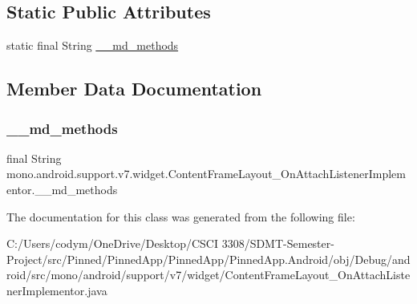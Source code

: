 \subsection*{Static Public Attributes}
\begin{DoxyCompactItemize}
\item 
static final String \hyperlink{classmono_1_1android_1_1support_1_1v7_1_1widget_1_1_content_frame_layout___on_attach_listener_implementor_adb104bec4ab09495309f1f1f22b6fac4}{\+\_\+\+\_\+md\+\_\+methods}
\end{DoxyCompactItemize}


\subsection{Member Data Documentation}
\mbox{\label{classmono_1_1android_1_1support_1_1v7_1_1widget_1_1_content_frame_layout___on_attach_listener_implementor_adb104bec4ab09495309f1f1f22b6fac4}} 
\subsubsection{\texorpdfstring{\+\_\+\+\_\+md\+\_\+methods}{\_\_md\_methods}}
{\footnotesize\ttfamily final String mono.\+android.\+support.\+v7.\+widget.\+Content\+Frame\+Layout\+\_\+\+On\+Attach\+Listener\+Implementor.\+\_\+\+\_\+md\+\_\+methods\hspace{0.3cm}{\ttfamily [static]}}



The documentation for this class was generated from the following file\+:\begin{DoxyCompactItemize}
\item 
C\+:/\+Users/codym/\+One\+Drive/\+Desktop/\+C\+S\+C\+I 3308/\+S\+D\+M\+T-\/\+Semester-\/\+Project/src/\+Pinned/\+Pinned\+App/\+Pinned\+App/\+Pinned\+App.\+Android/obj/\+Debug/android/src/mono/android/support/v7/widget/Content\+Frame\+Layout\+\_\+\+On\+Attach\+Listener\+Implementor.\+java\end{DoxyCompactItemize}
